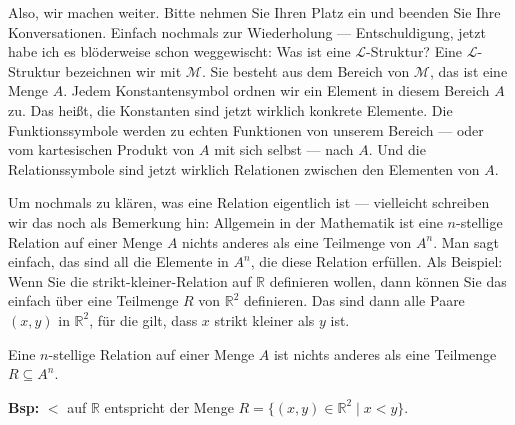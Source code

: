 \begin{spoken-clean}[00:46:04 - 00:48:03]
Also, wir machen weiter. Bitte nehmen Sie Ihren Platz ein und beenden Sie Ihre Konversationen. Einfach nochmals zur Wiederholung --- Entschuldigung, jetzt habe ich es blöderweise schon weggewischt: Was ist eine $\mathcal{L}$-Struktur? Eine $\mathcal{L}$-Struktur bezeichnen wir mit $\mathcal{M}$. Sie besteht aus dem Bereich von $\mathcal{M}$, das ist eine Menge $A$. Jedem Konstantensymbol ordnen wir ein Element in diesem Bereich $A$ zu. Das heißt, die Konstanten sind jetzt wirklich konkrete Elemente. Die Funktionssymbole werden zu echten Funktionen von unserem Bereich --- oder vom kartesischen Produkt von $A$ mit sich selbst --- nach $A$. Und die Relationssymbole sind jetzt wirklich Relationen zwischen den Elementen von $A$.

Um nochmals zu klären, was eine Relation eigentlich ist --- vielleicht schreiben wir das noch als Bemerkung hin: Allgemein in der Mathematik ist eine $n$-stellige Relation auf einer Menge $A$ nichts anderes als eine Teilmenge von $A^n$. Man sagt einfach, das sind all die Elemente in $A^n$, die diese Relation erfüllen. Als Beispiel: Wenn Sie die strikt-kleiner-Relation auf $\mathbb{R}$ definieren wollen, dann können Sie das einfach über eine Teilmenge $R$ von $\mathbb{R}^2$ definieren. Das sind dann alle Paare $(x, y)$ in $\mathbb{R}^2$, für die gilt, dass $x$ strikt kleiner als $y$ ist.
\end{spoken-clean}

\begin{math-stroke}
\begin{remark}
Eine $n$-stellige Relation auf einer Menge $A$ ist nichts anderes als eine Teilmenge $R \subseteq A^n$.
\end{remark}

\textbf{Bsp:} $<$ auf $\mathbb{R}$ entspricht der Menge $R = \{ (x,y) \in \mathbb{R}^2 \mid x < y \}$.
\end{math-stroke}

